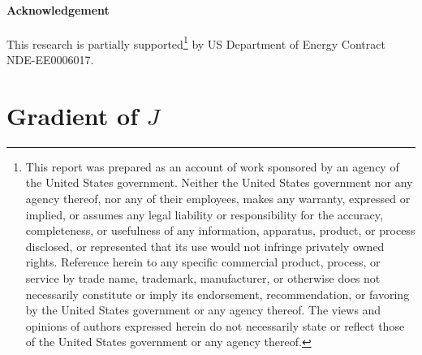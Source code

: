 \documentclass[onecolumn, 12pt, conference]{ieeeconf}
\begin{document}
\paragraph{Acknowledgement} %
This research is partially supported\footnote{\tiny This report was prepared as an account of work sponsored by an agency of the United States government. Neither the United States government nor any agency thereof, nor any of their employees, makes any warranty, expressed or implied, or assumes any legal liability or responsibility for the accuracy, completeness, or usefulness of any information, apparatus, product, or process disclosed, or represented that its use would not infringe privately owned rights. Reference herein to any specific commercial product, process, or service by trade name, trademark, manufacturer, or otherwise does not necessarily constitute or imply its endorsement, recommendation, or favoring by the United States government or any agency thereof. The views and opinions of authors expressed herein do not necessarily state or reflect those of the United States government or any agency thereof.} by US Department of Energy Contract NDE-EE0006017.


\appendix

\section{Gradient of $J$}
\label{sec:gradJ}
\end{document}
